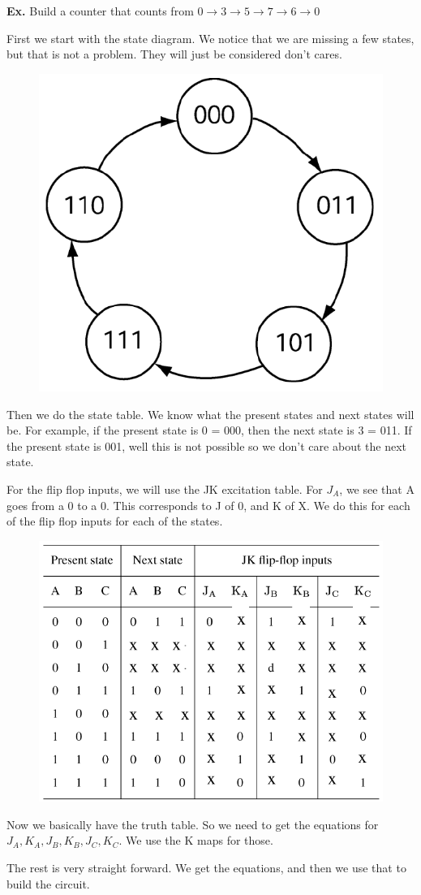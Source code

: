 \documentclass[12pt,letterpaper]{article} \usepackage{amsmath} \usepackage{graphicx}  \usepackage{longtable}  \usepackage{amssymb}
\begin{document}
        \begin{mdframed}
            \textbf{Ex. } Build a counter that counts from $0\to 3\to 5\to 7\to 6\to 0$

            First we start with the state diagram. We notice that we are missing a few states, but that is not a problem. They will just be considered don't cares. 
            \begin{figure}[H]
                \centering
                \includegraphics[width=0.2\linewidth]{ex7.png}
            \end{figure}

            Then we do the state table. We know what the present states and next states will be. For example, if the present state is 0 = 000, then the next state is 3 = 011. If the present state is 001, well this is not possible so we don't care about the next state. 

            For the flip flop inputs, we will use the JK excitation table. For $J_A$, we see that A goes from a 0 to a 0. This corresponds to J of 0, and K of X. We do this for each of the flip flop inputs for each of the states. 
            \begin{figure}[H]
                \centering
                \includegraphics[width=0.6\linewidth]{ex7-2.png}
            \end{figure}

            Now we basically have the truth table. So we need to get the equations for $J_A, K_A, J_B, K_B, J_C, K_C$. We use the K maps for those. 

            The rest is very straight forward. We get the equations, and then we use that to build the circuit. 


\end{mdframed}
\end{document}
